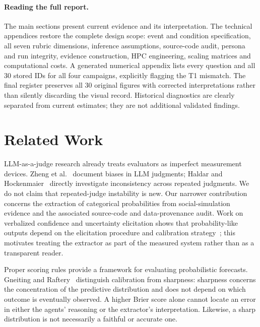 \documentclass[10pt,conference]{IEEEtran}
\begin{document}
\paragraph{Reading the full report.}
The main sections present current evidence and its interpretation. The
technical appendices restore the complete design scope: event and condition
specification, all seven rubric dimensions, inference assumptions, source-code
audit, persona and run integrity, evidence construction, HPC engineering,
scaling matrices and computational costs. A generated numerical appendix
lists every question and all 30 stored IDs for all four campaigns, explicitly
flagging the T1 mismatch. The final register preserves all 30 original
figures with corrected interpretations rather than silently discarding the
visual record. Historical diagnostics are clearly separated from current
estimates; they are not additional validated findings.

\section{Related Work}
LLM-as-a-judge research already treats evaluators as imperfect measurement
devices. Zheng et al.~\cite{zheng2023} document biases in LLM judgments;
Haldar and Hockenmaier~\cite{haldar2025} directly investigate inconsistency across
repeated judgments. We do not claim that repeated-judge instability is new.
Our narrower contribution concerns the extraction of categorical probabilities
from social-simulation evidence and the associated source-code and data-provenance
audit. Work on verbalized confidence and uncertainty elicitation shows that
probability-like outputs depend on the elicitation procedure and calibration
strategy~\cite{tian2023calibration,xiong2024uncertainty}; this motivates treating
the extractor as part of the measured system rather than as a transparent reader.

Proper scoring rules provide a framework for evaluating probabilistic forecasts.
Gneiting and Raftery~\cite{gneiting2007} distinguish calibration from sharpness:
sharpness concerns the concentration of the predictive distribution and does not
depend on which outcome is eventually observed. A higher Brier score alone cannot
locate an error in either the agents' reasoning or the extractor's interpretation.
Likewise, a sharp distribution is not necessarily a faithful or accurate one.
\end{document}
